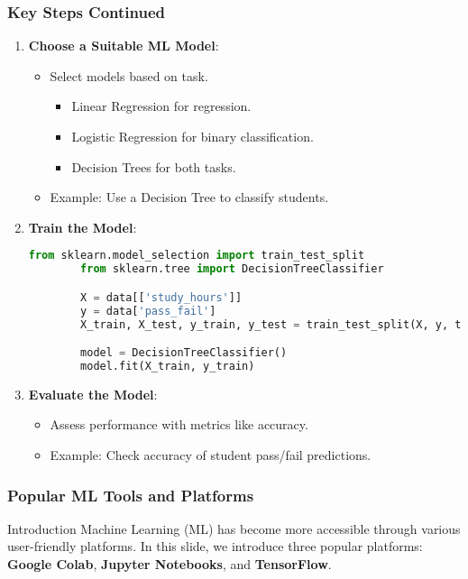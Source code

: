 \documentclass[aspectratio=169]{beamer}
\begin{document}
\begin{frame}[fragile]
    \frametitle{Key Steps Continued}
    \begin{enumerate}[resume]
        \item \textbf{Choose a Suitable ML Model}:
        \begin{itemize}
            \item Select models based on task. 
            \begin{itemize}
                \item Linear Regression for regression.
                \item Logistic Regression for binary classification.
                \item Decision Trees for both tasks.
            \end{itemize}
            \item Example: Use a Decision Tree to classify students.
        \end{itemize}

        \item \textbf{Train the Model}:
        \begin{lstlisting}[language=Python]
        from sklearn.model_selection import train_test_split
        from sklearn.tree import DecisionTreeClassifier

        X = data[['study_hours']]
        y = data['pass_fail']
        X_train, X_test, y_train, y_test = train_test_split(X, y, test_size=0.2)

        model = DecisionTreeClassifier()
        model.fit(X_train, y_train)
        \end{lstlisting}

        \item \textbf{Evaluate the Model}:
        \begin{itemize}
            \item Assess performance with metrics like accuracy.
            \item Example: Check accuracy of student pass/fail predictions.
        \end{itemize}
    \end{enumerate}
\end{frame}

\begin{frame}
    \frametitle{Popular ML Tools and Platforms}
    \begin{block}{Introduction}
        Machine Learning (ML) has become more accessible through various user-friendly platforms.
        In this slide, we introduce three popular platforms: \textbf{Google Colab}, \textbf{Jupyter Notebooks}, and \textbf{TensorFlow}.
    \end{block}
\end{frame}
\end{document}

